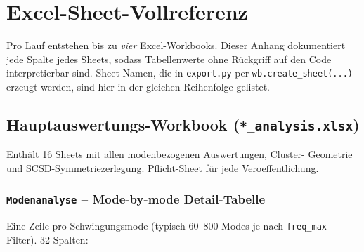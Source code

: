 \documentclass[11pt,a4paper,twoside]{article}
\theoremstyle{remark}
\begin{document}
\section{Excel-Sheet-Vollreferenz}
\label{app:sheet-referenz}

Pro Lauf entstehen bis zu \emph{vier} Excel-Workbooks. Dieser Anhang
dokumentiert jede Spalte jedes Sheets, sodass Tabellenwerte ohne
R\"uckgriff auf den Code interpretierbar sind. Sheet-Namen, die in
\texttt{export.py} per \texttt{wb.create\_sheet(...)} erzeugt werden,
sind hier in der gleichen Reihenfolge gelistet.

\subsection{Hauptauswertungs-Workbook (\texttt{*\_analysis.xlsx})}
\label{app:wb-hauptauswertung}

Enth\"alt 16 Sheets mit allen modenbezogenen Auswertungen, Cluster-
Geometrie und SCSD-Symmetriezerlegung. Pflicht-Sheet f\"ur jede
Veroeffentlichung.

\subsubsection*{\texttt{Modenanalyse} -- Mode-by-mode Detail-Tabelle}

Eine Zeile pro Schwingungsmode (typisch 60--800 Modes je nach
\texttt{freq\_max}-Filter). 32 Spalten:
\end{document}
